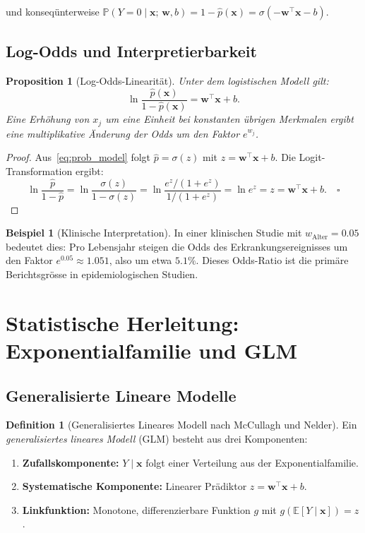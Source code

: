 ﻿\documentclass[12pt, a4paper]{article}
\newtheorem{proposition}[theorem]{Proposition}
\theoremstyle{definition}
\newtheorem{definition}[theorem]{Definition}
\newtheorem{example}[theorem]{Beispiel}
\theoremstyle{remark}
\newcommand{\E}{\mathbb{E}}
\newcommand{\Prob}{\mathbb{P}}
\newcommand{\sigmoid}{\sigma}
\newcommand{\vw}{\bm{w}}
\newcommand{\vx}{\bm{x}}
\newcommand{\T}{\top}
\begin{document}
und konseqünterweise $\Prob(Y=0 \mid \vx;\,\vw,b) = 1 - \hat{p}(\vx) = \sigmoid(-\vw^\T\vx - b)$.

\subsection{Log-Odds und Interpretierbarkeit}

\begin{proposition}[Log-Odds-Linearität]
  Unter dem logistischen Modell gilt:
  \begin{equation}
    \ln\frac{\hat{p}(\vx)}{1-\hat{p}(\vx)} = \vw^\T\vx + b.
    \label{eq:log_odds}
  \end{equation}
  Eine Erhöhung von $x_j$ um eine Einheit bei konstanten übrigen Merkmalen ergibt eine
  multiplikative Änderung der Odds um den Faktor $e^{w_j}$.
\end{proposition}

\begin{proof}
  Aus~\eqref{eq:prob_model} folgt $\hat{p} = \sigmoid(z)$ mit $z = \vw^\T\vx+b$.
  Die Logit-Transformation ergibt:
  \[
    \ln\frac{\hat{p}}{1-\hat{p}} = \ln\frac{\sigmoid(z)}{1-\sigmoid(z)}
    = \ln\frac{e^z/(1+e^z)}{1/(1+e^z)} = \ln e^z = z = \vw^\T\vx+b. \quad \square
  \]
\end{proof}

\begin{example}[Klinische Interpretation]
  In einer klinischen Studie mit $w_{\text{Alter}} = 0.05$ bedeutet dies: Pro Lebensjahr
  steigen die Odds des Erkrankungsereignisses um den Faktor $e^{0.05} \approx 1.051$, also um
  etwa $5.1\%$. Dieses Odds-Ratio ist die primäre Berichtsgrösse in epidemiologischen Studien.
\end{example}

\section{Statistische Herleitung: Exponentialfamilie und GLM}

\subsection{Generalisierte Lineare Modelle}

\begin{definition}[Generalisiertes Lineares Modell nach McCullagh und Nelder]
  Ein \emph{generalisiertes lineares Modell} (GLM) besteht aus drei Komponenten:
  \begin{enumerate}[label=(\roman*)]
    \item \textbf{Zufallskomponente:} $Y \mid \vx$ folgt einer Verteilung aus der Exponentialfamilie.
    \item \textbf{Systematische Komponente:} Linearer Prädiktor $z = \vw^\T\vx + b$.
    \item \textbf{Linkfunktion:} Monotone, differenzierbare Funktion $g$ mit $g(\E[Y\mid\vx]) = z$.
  \end{enumerate}
\end{definition}
\end{document}
